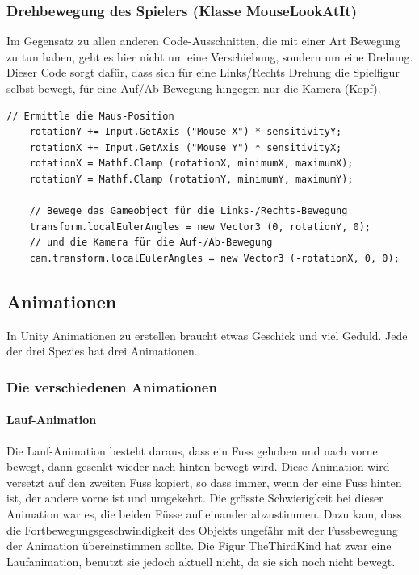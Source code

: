 \subsubsection{Drehbewegung des Spielers (Klasse MouseLookAtIt)}
Im Gegensatz zu allen anderen Code-Ausschnitten, die mit einer Art Bewegung zu tun haben, geht es hier nicht um eine Verschiebung, sondern um eine Drehung.
Dieser Code sorgt dafür, dass sich für eine Links/Rechts Drehung die Spielfigur selbst bewegt, für eine Auf/Ab Bewegung hingegen nur die Kamera (Kopf).


\begin{lstlisting}[caption={Drehbewegungen}]
	// Ermittle die Maus-Position
	rotationY += Input.GetAxis ("Mouse X") * sensitivityY;
	rotationX += Input.GetAxis ("Mouse Y") * sensitivityX;
	rotationX = Mathf.Clamp (rotationX, minimumX, maximumX);
	rotationY = Mathf.Clamp (rotationY, minimumY, maximumY);
	
	// Bewege das Gameobject für die Links-/Rechts-Bewegung
	transform.localEulerAngles = new Vector3 (0, rotationY, 0);
	// und die Kamera für die Auf-/Ab-Bewegung
	cam.transform.localEulerAngles = new Vector3 (-rotationX, 0, 0);
\end{lstlisting}

\subsection{Animationen}
In Unity Animationen zu erstellen braucht etwas Geschick und viel Geduld. Jede der drei Spezies hat drei Animationen.

\subsubsection{Die verschiedenen Animationen}
\label{subsubsec:animations}
\paragraph{Lauf-Animation}

Die Lauf-Animation besteht daraus, dass ein Fuss gehoben und nach vorne bewegt, dann gesenkt wieder nach hinten bewegt wird. Diese Animation wird versetzt auf den zweiten Fuss kopiert, so dass immer, wenn der eine Fuss hinten ist, der andere vorne ist und umgekehrt. Die grösste Schwierigkeit bei dieser Animation war es, die beiden Füsse auf einander abzustimmen. Dazu kam, dass die Fortbewegungsgeschwindigkeit des Objekts ungefähr mit der Fussbewegung der Animation übereinstimmen sollte. Die Figur TheThirdKind hat zwar eine Laufanimation, benutzt sie jedoch aktuell nicht, da sie sich noch nicht bewegt.


